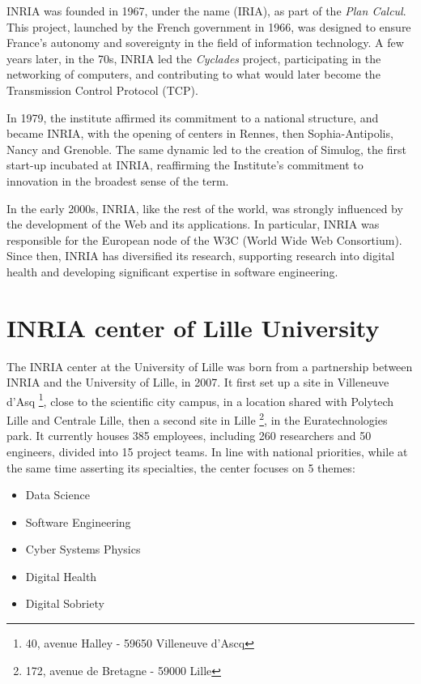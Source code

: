 INRIA was founded in 1967, under the name  (IRIA), as part of the \textit{Plan Calcul}\cite{PlanCalcul}. This project, launched by the French government in 1966, was designed to ensure France's autonomy and sovereignty in the field of information technology.
A few years later, in the 70s, INRIA led the \textit{Cyclades} project, participating in the networking of computers, and contributing to what would later become the Transmission Control Protocol (TCP).

In 1979, the institute affirmed its commitment to a national structure, and became INRIA, with the opening of centers in Rennes, then Sophia-Antipolis, Nancy and Grenoble. The same dynamic led to the creation of Simulog, the first start-up incubated at INRIA, reaffirming the Institute's commitment to innovation in the broadest sense of the term.

In the early 2000s, INRIA, like the rest of the world, was strongly influenced by the development of the Web and its applications. In particular, INRIA was responsible for the European node of the W3C (World Wide Web Consortium). Since then, INRIA has diversified its research, supporting research into digital health and developing significant expertise in software engineering. 

\section{INRIA center of Lille University}
The INRIA center at the University of Lille was born from a partnership between INRIA and the University of Lille, in 2007. It first set up a site in Villeneuve d'Asq \footnote{40, avenue Halley - 59650 Villeneuve d'Ascq}, close to the scientific city campus, in a location shared with Polytech Lille and Centrale Lille, then a second site in Lille \footnote{172, avenue de Bretagne - 59000 Lille}, in the Euratechnologies park. It currently houses 385 employees, including 260 researchers and 50 engineers, divided into 15 project teams.
In line with national priorities, while at the same time asserting its specialties, the center focuses on 5 themes: 
\begin{multicols}{2}
    
\begin{itemize}
    \item Data Science
    \item Software Engineering
    \item Cyber Systems Physics
    \item Digital Health
    \item Digital Sobriety
\end{itemize}
\end{multicols}


